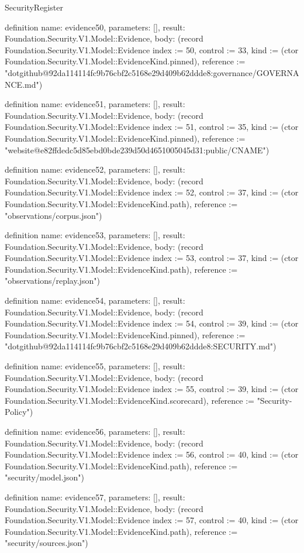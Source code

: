 \begin{lexlean}{SecurityRegister}
\begin{semanticmodule}
definition{
  name: evidence50,
  parameters: [],
  result: Foundation.Security.V1.Model::Evidence,
  body: (record Foundation.Security.V1.Model::Evidence {index := 50, control := 33, kind := (ctor Foundation.Security.V1.Model::EvidenceKind.pinned), reference := "dotgithub@92da114114fc9b76cbf2c5168e29d409b62ddde8:governance/GOVERNANCE.md"})
}

definition{
  name: evidence51,
  parameters: [],
  result: Foundation.Security.V1.Model::Evidence,
  body: (record Foundation.Security.V1.Model::Evidence {index := 51, control := 35, kind := (ctor Foundation.Security.V1.Model::EvidenceKind.pinned), reference := "website@e82ffdedc5d85ebd0bde239d50d4651005045d31:public/CNAME"})
}

definition{
  name: evidence52,
  parameters: [],
  result: Foundation.Security.V1.Model::Evidence,
  body: (record Foundation.Security.V1.Model::Evidence {index := 52, control := 37, kind := (ctor Foundation.Security.V1.Model::EvidenceKind.path), reference := "observations/corpus.json"})
}

definition{
  name: evidence53,
  parameters: [],
  result: Foundation.Security.V1.Model::Evidence,
  body: (record Foundation.Security.V1.Model::Evidence {index := 53, control := 37, kind := (ctor Foundation.Security.V1.Model::EvidenceKind.path), reference := "observations/replay.json"})
}

definition{
  name: evidence54,
  parameters: [],
  result: Foundation.Security.V1.Model::Evidence,
  body: (record Foundation.Security.V1.Model::Evidence {index := 54, control := 39, kind := (ctor Foundation.Security.V1.Model::EvidenceKind.pinned), reference := "dotgithub@92da114114fc9b76cbf2c5168e29d409b62ddde8:SECURITY.md"})
}

definition{
  name: evidence55,
  parameters: [],
  result: Foundation.Security.V1.Model::Evidence,
  body: (record Foundation.Security.V1.Model::Evidence {index := 55, control := 39, kind := (ctor Foundation.Security.V1.Model::EvidenceKind.scorecard), reference := "Security-Policy"})
}

definition{
  name: evidence56,
  parameters: [],
  result: Foundation.Security.V1.Model::Evidence,
  body: (record Foundation.Security.V1.Model::Evidence {index := 56, control := 40, kind := (ctor Foundation.Security.V1.Model::EvidenceKind.path), reference := "security/model.json"})
}

definition{
  name: evidence57,
  parameters: [],
  result: Foundation.Security.V1.Model::Evidence,
  body: (record Foundation.Security.V1.Model::Evidence {index := 57, control := 40, kind := (ctor Foundation.Security.V1.Model::EvidenceKind.path), reference := "security/sources.json"})
}


\end{semanticmodule}
\end{lexlean}
